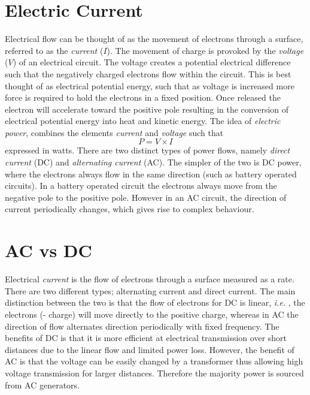 \documentclass{article}
\newcommand{\ie}{\textit{i.e. }}
\begin{document}
\section{Electric Current}

Electrical flow can be thought of as the movement of electrons through a surface, referred to as the {\it current} ($I$). The movement of charge is provoked by the {\it voltage} ($V$) of an electrical circuit. The voltage creates a potential electrical difference such that the negatively charged electrons flow within the circuit. This is best thought of as electrical potential energy, such that as voltage is increased more force is required to hold the electrons in a fixed position. Once released the electron will accelerate toward the positive pole resulting in the conversion of electrical potential energy into heat and kinetic energy. The idea of {\it electric power}, combines the elements {\it current} and {\it voltage} such that 
\begin{equation}
P=V\times I
\end{equation}
expressed in watts. There are two distinct types of power flows, namely {\it direct current} (DC) and {\it alternating current} (AC). The simpler of the two is DC power, where the electrons always flow in the same direction (such as battery operated circuits). In a battery operated circuit the electrons always move from the negative pole to the positive pole. However in an AC circuit, the direction of current periodically changes, which gives rise to complex behaviour.  

\section{AC vs DC}

Electrical {\it current} is the flow of electrons through a surface measured as a rate. There are two different types; alternating current and direct current. The main distinction between the two is that the flow of electrons for DC is linear, \ie, the electrons (- charge) will move directly to the positive charge, whereas in AC the direction of flow alternates direction periodically with fixed frequency. The benefits of DC is that it is more efficient at electrical transmission over short distances due to the linear flow and limited power loss. However, the benefit of AC is that the voltage can be easily changed by a transformer thus allowing high voltage transmission for larger distances. Therefore the majority power is sourced from AC generators. 
\end{document}
